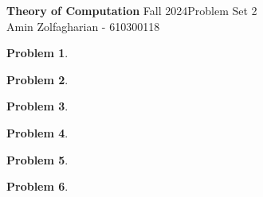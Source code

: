 \documentclass[12pt]{article}
\newcommand{\customanswer}[1]{%
\begin{problem}
\end{problem}

}
\newtheorem{problem}{Problem}
\begin{document}
\noindent \textbf{Theory of Computation} Fall 2024\hfill Problem Set 2\\
Amin Zolfagharian - 610300118

\hrulefill

\customanswer{1}
\customanswer{2}
\customanswer{3}
\customanswer{4}
\customanswer{5}
\customanswer{6}
\end{document}

